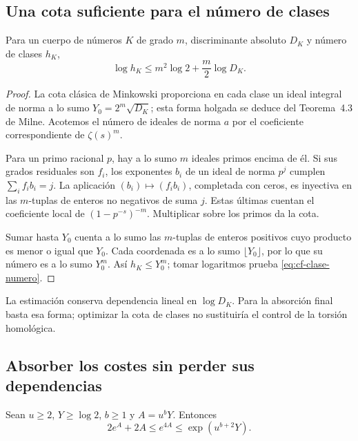 \subsection{Una cota suficiente para el número de clases}

\begin{proposicion}
\label{prop:cf-clase-numero}
Para un cuerpo de números $K$ de grado $m$, discriminante
absoluto $D_K$ y número de clases $h_K$,
\begin{equation}
 \log h_K\le m^2\log2+\frac m2\log D_K.
 \label{eq:cf-clase-numero}
\end{equation}
\end{proposicion}

\begin{proof}
La cota clásica de Minkowski proporciona en cada clase un ideal
integral de norma a lo sumo $Y_0=2^m\sqrt{D_K}$;
esta forma holgada se deduce del Teorema~4.3 de Milne.
Acotemos el número de ideales de norma $a$ por el coeficiente
correspondiente de $\zeta(s)^m$.

Para un primo racional $p$, hay a lo sumo $m$ ideales primos
encima de él. Si sus grados residuales son $f_i$, los exponentes
$b_i$ de un ideal de norma $p^j$ cumplen $\sum_i f_ib_i=j$.
La aplicación $(b_i)\mapsto(f_ib_i)$, completada con ceros,
es inyectiva en las $m$-tuplas de enteros no negativos de suma
$j$. Estas últimas cuentan el coeficiente local de
$(1-p^{-s})^{-m}$. Multiplicar sobre los primos da la cota.

Sumar hasta $Y_0$ cuenta a lo sumo las $m$-tuplas de enteros
positivos cuyo producto es menor o igual que $Y_0$.
Cada coordenada es a lo sumo $\lfloor Y_0\rfloor$, por lo
que su número es a lo sumo $Y_0^m$.
Así $h_K\le Y_0^m$; tomar logaritmos prueba
\eqref{eq:cf-clase-numero}.
\end{proof}

La estimación conserva dependencia lineal en $\log D_K$.
Para la absorción final basta esa forma; optimizar la cota de
clases no sustituiría el control de la torsión homológica.

\subsection{Absorber los costes sin perder sus dependencias}

\begin{lema}
\label{lem:cf-absorcion}
Sean $u\ge2$, $Y\ge\log2$, $b\ge1$ y $A=u^bY$.
Entonces
\begin{equation}
 2e^A+2A\le e^{4A}\le\exp(u^{b+2}Y).
 \label{eq:cf-absorcion}
\end{equation}
\end{lema}

